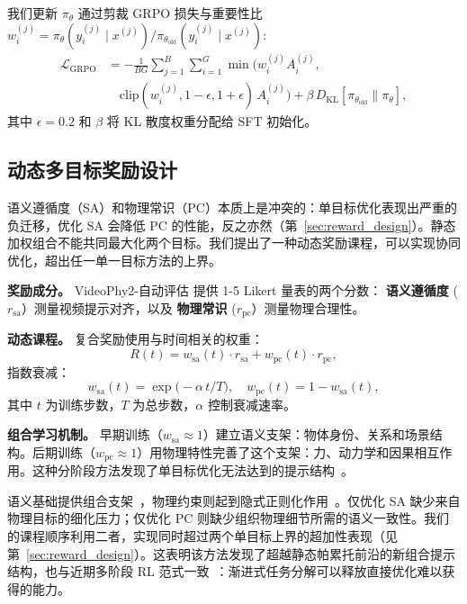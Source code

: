 我们更新 $\pi_\theta$ 通过剪裁 GRPO 损失与重要性比
$w_i^{(j)} = \pi_{\theta}(y_i^{(j)}\mid x^{(j)})/\pi_{\theta_{\text{old}}}(y_i^{(j)}\mid x^{(j)})$:
\begin{align}
  \mathcal{L}_{\text{GRPO}}
  &= -\frac{1}{BG}\sum_{j=1}^B\sum_{i=1}^G
    \min\bigl(
      w_i^{(j)} A_i^{(j)}, \nonumber \\
    &\quad \text{clip}(w_i^{(j)}, 1-\epsilon, 1+\epsilon)\,A_i^{(j)}
    \bigr)
    + \beta\,D_{\mathrm{KL}}[\pi_{\theta_{\text{old}}}\|\pi_{\theta}],
\end{align}
其中 $\epsilon=0.2$ 和 $\beta$ 将 KL 散度权重分配给 SFT 初始化。

\subsection{动态多目标奖励设计}

语义遵循度（SA）和物理常识（PC）本质上是冲突的：单目标优化表现出严重的负迁移，优化 SA 会降低 PC 的性能，反之亦然（第~\ref{sec:reward_design}）。静态加权组合不能共同最大化两个目标。我们提出了一种动态奖励课程，可以实现协同优化，超出任一单一目标方法的上界。

\noindent\textbf{奖励成分。}
VideoPhy2-自动评估 \cite{bansal2025videophy2} 提供 1-5 Likert 量表的两个分数： \textbf{语义遵循度} ($r_{\text{sa}}$）测量视频提示对齐，以及 \textbf{物理常识} ($r_{\text{pc}}$）测量物理合理性。

\noindent\textbf{动态课程。}
复合奖励使用与时间相关的权重：
\begin{equation}
  R(t) = w_{\text{sa}}(t) \cdot r_{\text{sa}} + w_{\text{pc}}(t) \cdot r_{\text{pc}},
  \label{eq:total_reward}
\end{equation}
指数衰减：
\begin{equation}
  w_{\text{sa}}(t)=\exp\bigl(-\alpha\,t/T\bigr),\quad
  w_{\text{pc}}(t)=1-w_{\text{sa}}(t),
  \label{eq:weights}
\end{equation}
其中 $t$ 为训练步数，$T$ 为总步数，$\alpha$ 控制衰减速率。

\noindent\textbf{组合学习机制。}
早期训练（$w_{\text{sa}} \approx 1$）建立语义支架：物体身份、关系和场景结构。后期训练（$w_{\text{pc}} \approx 1$）用物理特性完善了这个支架：力、动力学和因果相互作用。这种分阶段方法发现了单目标优化无法达到的提示结构~\cite{bengio2009curriculum}。

语义基础提供组合支架~\cite{scholkopf2021toward}，物理约束则起到隐式正则化作用~\cite{liebel2018auxiliary}。仅优化 SA 缺少来自物理目标的细化压力；仅优化 PC 则缺少组织物理细节所需的语义一致性。我们的课程顺序利用二者，实现同时超过两个单目标上界的超加性表现（见第~\ref{sec:reward_design}）。这表明该方法发现了超越静态帕累托前沿的新组合提示结构，也与近期多阶段 RL 范式一致~\cite{guo2025deepseek}：渐进式任务分解可以释放直接优化难以获得的能力。
